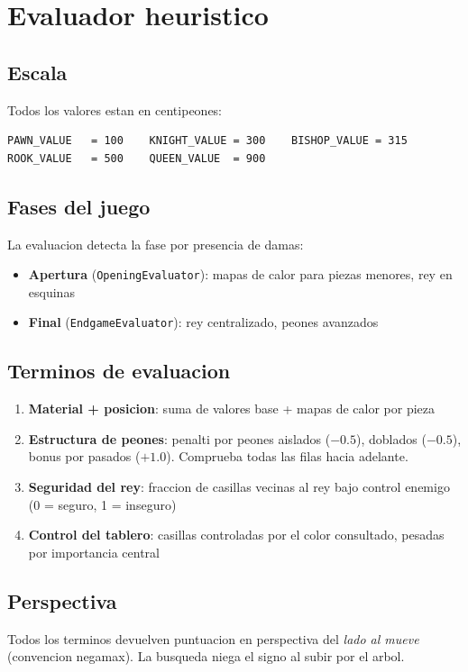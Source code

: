 \documentclass[11pt,a4paper]{article}
\begin{document}
\section{Evaluador heuristico}

\subsection*{Escala}
Todos los valores estan en centipeones:
\begin{verbatim}
PAWN_VALUE   = 100    KNIGHT_VALUE = 300    BISHOP_VALUE = 315
ROOK_VALUE   = 500    QUEEN_VALUE  = 900
\end{verbatim}

\subsection*{Fases del juego}
La evaluacion detecta la fase por presencia de damas:
\begin{itemize}
  \item \textbf{Apertura} (\texttt{OpeningEvaluator}): mapas de calor para piezas menores, rey en esquinas
  \item \textbf{Final} (\texttt{EndgameEvaluator}): rey centralizado, peones avanzados
\end{itemize}

\subsection*{Terminos de evaluacion}
\begin{enumerate}
  \item \textbf{Material + posicion}: suma de valores base + mapas de calor por pieza
  \item \textbf{Estructura de peones}: penalti por peones aislados ($-0.5$), doblados ($-0.5$), bonus por pasados ($+1.0$). Comprueba todas las filas hacia adelante.
  \item \textbf{Seguridad del rey}: fraccion de casillas vecinas al rey bajo control enemigo (0 = seguro, 1 = inseguro)
  \item \textbf{Control del tablero}: casillas controladas por el color consultado, pesadas por importancia central
\end{enumerate}

\subsection*{Perspectiva}
Todos los terminos devuelven puntuacion en perspectiva del \emph{lado al mueve}
(convencion negamax). La busqueda niega el signo al subir por el arbol.
\end{document}
